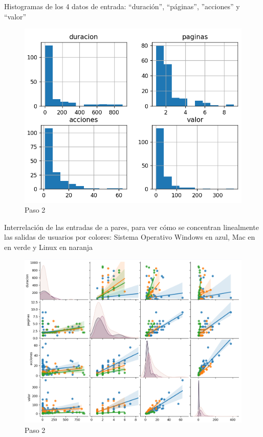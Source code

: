 \documentclass{article}
\begin{document}
\newpage
Histogramas de los 4 datos de entrada: “duración”, “páginas”, ”acciones” y “valor” 
\begin{figure}[H]
    \centering
    \includegraphics[width=0.8\linewidth]{img/a11_histograma.png}
    \caption{Paso 2}
    \label{fig:figure2}
\end{figure}

\newpage
Interrelación de las entradas de a pares, para ver cómo se concentran linealmente las salidas de usuarios por colores: Sistema Operativo Windows en azul, Mac en en verde y Linux en naranja
\begin{figure}[H]
    \centering
    \includegraphics[width=1\linewidth]{img/a11_relacion.png}
    \caption{Paso 2}
    \label{fig:figure2}
\end{figure}
\end{document}
